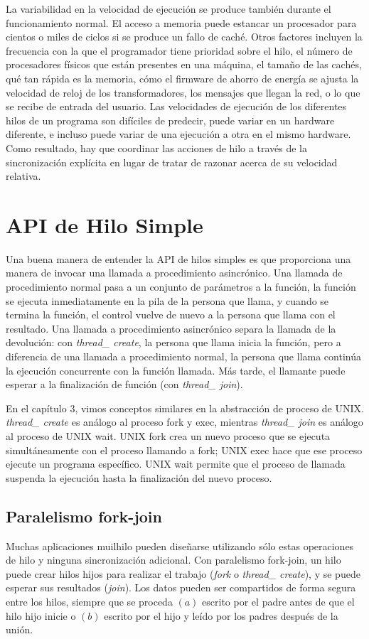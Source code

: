 \documentclass[10pt]{book}
\begin{document}
La variabilidad en la velocidad de ejecución se produce también durante el funcionamiento normal. El acceso a memoria puede estancar un procesador para cientos o miles de ciclos si se produce un fallo de caché. Otros factores incluyen la frecuencia con la que el programador tiene prioridad sobre el hilo, el número de procesadores físicos que están presentes en una máquina, el tamaño de las cachés, qué tan rápida es la memoria, cómo el firmware de ahorro de energía se ajusta la velocidad de reloj de los transformadores, los mensajes que llegan la red, o lo que se recibe de entrada del usuario. Las velocidades de ejecución de los diferentes hilos de un programa son difíciles de predecir, puede variar en un hardware diferente, e incluso puede variar de una ejecución a otra en el mismo hardware. Como resultado, hay que coordinar las acciones de hilo a través de la sincronización explícita en lugar de tratar de razonar acerca de su velocidad relativa.

\section{API de Hilo Simple}
Una buena manera de entender la API de hilos simples es que proporciona una manera de invocar una llamada a procedimiento asincrónico. Una llamada de procedimiento normal pasa a un conjunto de parámetros a la función, la función se ejecuta inmediatamente en la pila de la persona que llama, y cuando se termina la función, el control vuelve de nuevo a la persona que llama con el resultado. Una llamada a procedimiento asincrónico separa la llamada de la devolución: con \textit{thread\_ create}, la persona que llama inicia la función, pero a diferencia de una llamada a procedimiento normal, la persona que llama continúa la ejecución concurrente con la función llamada. Más tarde, el llamante puede esperar a la finalización de función (con \textit{thread\_ join}).

En el capítulo 3, vimos conceptos similares en la abstracción de proceso de UNIX. \textit{thread\_ create} es análogo al proceso fork y exec, mientras \textit{thread\_ join} es análogo al proceso de UNIX wait. UNIX fork crea un nuevo proceso que se ejecuta simultáneamente con el proceso llamando a fork; UNIX exec hace que ese proceso ejecute un programa específico. UNIX wait permite que el proceso de llamada suspenda la ejecución hasta la finalización del nuevo proceso.

\subsection{Paralelismo fork-join}
Muchas aplicaciones muilhilo pueden diseñarse utilizando sólo estas operaciones de hilo y ninguna sincronización adicional. Con paralelismo fork-join, un hilo puede crear hilos hijos para realizar el trabajo (\textit{fork} o \textit{thread\_ create}), y se puede esperar sus resultados (\textit{join}). Los datos pueden ser compartidos de forma segura entre los hilos, siempre que se proceda $(a)$ escrito por el padre antes de que el hilo hijo inicie o $(b)$ escrito por el hijo y leído por los padres después de la unión.
\end{document}
